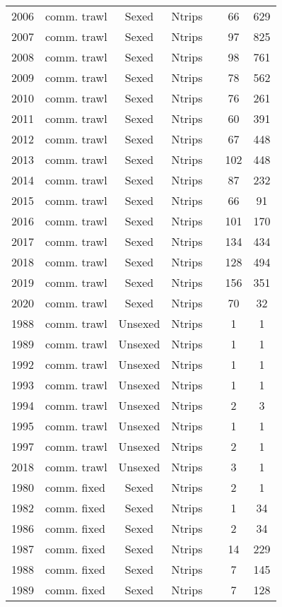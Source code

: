 \begin{longtable}[t]{c>{\centering\arraybackslash}p{3cm}ccccc}
2006 & comm. trawl & Sexed & Ntrips &  & 66 & 629\\
2007 & comm. trawl & Sexed & Ntrips &  & 97 & 825\\
2008 & comm. trawl & Sexed & Ntrips &  & 98 & 761\\
2009 & comm. trawl & Sexed & Ntrips &  & 78 & 562\\
2010 & comm. trawl & Sexed & Ntrips &  & 76 & 261\\
2011 & comm. trawl & Sexed & Ntrips &  & 60 & 391\\
2012 & comm. trawl & Sexed & Ntrips &  & 67 & 448\\
2013 & comm. trawl & Sexed & Ntrips &  & 102 & 448\\
2014 & comm. trawl & Sexed & Ntrips &  & 87 & 232\\
2015 & comm. trawl & Sexed & Ntrips &  & 66 & 91\\
2016 & comm. trawl & Sexed & Ntrips &  & 101 & 170\\
2017 & comm. trawl & Sexed & Ntrips &  & 134 & 434\\
2018 & comm. trawl & Sexed & Ntrips &  & 128 & 494\\
2019 & comm. trawl & Sexed & Ntrips &  & 156 & 351\\
2020 & comm. trawl & Sexed & Ntrips &  & 70 & 32\\
1988 & comm. trawl & Unsexed & Ntrips &  & 1 & 1\\
1989 & comm. trawl & Unsexed & Ntrips &  & 1 & 1\\
1992 & comm. trawl & Unsexed & Ntrips &  & 1 & 1\\
1993 & comm. trawl & Unsexed & Ntrips &  & 1 & 1\\
1994 & comm. trawl & Unsexed & Ntrips &  & 2 & 3\\
1995 & comm. trawl & Unsexed & Ntrips &  & 1 & 1\\
1997 & comm. trawl & Unsexed & Ntrips &  & 2 & 1\\
2018 & comm. trawl & Unsexed & Ntrips &  & 3 & 1\\
1980 & comm. fixed & Sexed & Ntrips &  & 2 & 1\\
1982 & comm. fixed & Sexed & Ntrips &  & 1 & 34\\
1986 & comm. fixed & Sexed & Ntrips &  & 2 & 34\\
1987 & comm. fixed & Sexed & Ntrips &  & 14 & 229\\
1988 & comm. fixed & Sexed & Ntrips &  & 7 & 145\\
1989 & comm. fixed & Sexed & Ntrips &  & 7 & 128\\

\end{longtable}
